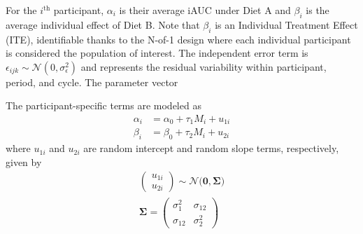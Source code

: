 \documentclass[12pt]{article}
\begin{document}
For the $i^{\textrm{th}}$ participant, $\alpha_i$ is their average iAUC under Diet A and $\beta_i$ is the average individual effect of Diet B. Note that $\beta_i$ is an Individual Treatment Effect (ITE), identifiable thanks to the N-of-1 design where each individual participant is considered the population of interest. The independent error term is $\epsilon_{ijk}\sim\mathcal{N}(0, \sigma_{\epsilon}^2)$ and represents the residual variability within participant, period, and cycle.
The parameter vector

The participant-specific terms are modeled as
\begin{align}
    \alpha_i &= \alpha_0 + \tau_1 M_i + u_{1i}\\
    \beta_i &= \beta_0 + \tau_2 M_i + u_{2i}
\end{align}
where $u_{1i}$ and $u_{2i}$ are random intercept and random slope terms, respectively, given by
\begin{align}
    \begin{pmatrix}u_{1i}\\u_{2i}\end{pmatrix} \sim \mathcal{N}\Big(
    \bm{0}, \bm{\Sigma}
    \Big)\\
    \bm{\Sigma} = \begin{pmatrix}
        \sigma_1^2&\sigma_{12}\\
        \sigma_{12}&\sigma_{2}^2
    \end{pmatrix}\label{raneff-cov}
\end{align}
\end{document}
